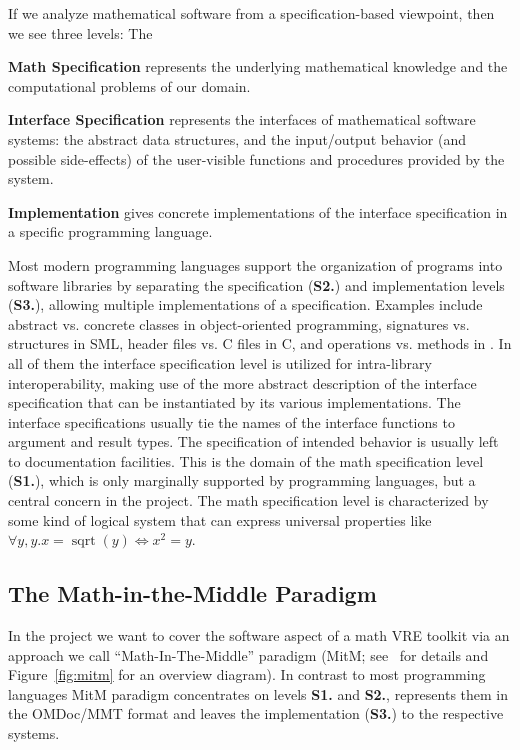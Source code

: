 If we analyze mathematical software from a specification-based viewpoint, then we see
three levels: The 
\begin{compactenum}[\rm\bf S1.]
\item \textbf{Math Specification} represents the underlying mathematical knowledge and
  the computational problems of our domain.
\item \textbf{Interface Specification} represents the interfaces of mathematical software
  systems: the abstract data structures, and the input/output behavior (and possible
  side-effects) of the user-visible functions and procedures provided by the system.
\item \textbf{Implementation} gives concrete implementations of the interface
  specification in a specific programming language.
\end{compactenum}
Most modern programming languages support the organization of programs into software
libraries by separating the specification (\textbf{S2.}) and implementation levels
(\textbf{S3.}), allowing multiple implementations of a specification. Examples include
abstract vs. concrete classes in object-oriented programming, signatures vs. structures in
SML, header files vs. C files in C, and operations vs. methods in \GAP. In all of them the
interface specification level is utilized for intra-library interoperability, making use
of the more abstract description of the interface specification that can be instantiated
by its various implementations. The interface specifications usually tie the names of the
interface functions to argument and result types. The specification of intended behavior
is usually left to documentation facilities. This is the domain of the math specification
level (\textbf{S1.}), which is only marginally supported by programming languages, but a
central concern in the \pn project. The math specification level is characterized by some
kind of logical system that can express universal properties like
$\forall y,y. x=\operatorname{sqrt}(y) \Leftrightarrow x^2=y$.

\subsection{The Math-in-the-Middle Paradigm}

In the \pn project we want to cover the software aspect of a math VRE toolkit via an
approach we call ``Math-In-The-Middle'' paradigm (MitM; see~\cite{DehKohKon:iop16} for
details and Figure~\ref{fig:mitm} for an overview diagram). In contrast to most
programming languages MitM paradigm concentrates on levels \textbf{S1.} and \textbf{S2.},
represents them in the OMDoc/MMT format and leaves the implementation (\textbf{S3.}) to
the respective systems.

